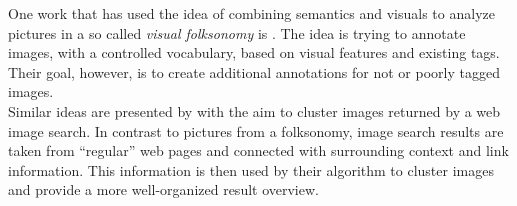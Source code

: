\bigskip
One work that has used the idea of combining semantics and visuals to analyze pictures in a so called \emph{visual folksonomy} is \cite{Lindstaedt2009}. The idea is trying to annotate images, with a controlled vocabulary, based on visual features and existing tags. Their goal, however, is to create additional annotations for not or poorly tagged images. \\
Similar ideas are presented by \cite{cai2004hierarchical} with the aim to cluster images returned by a web image search. In contrast to pictures from a folksonomy, image search results are taken from ``regular'' web pages and connected with surrounding context and link information. This information is then used by their algorithm to cluster images and provide a more well-organized result overview.
